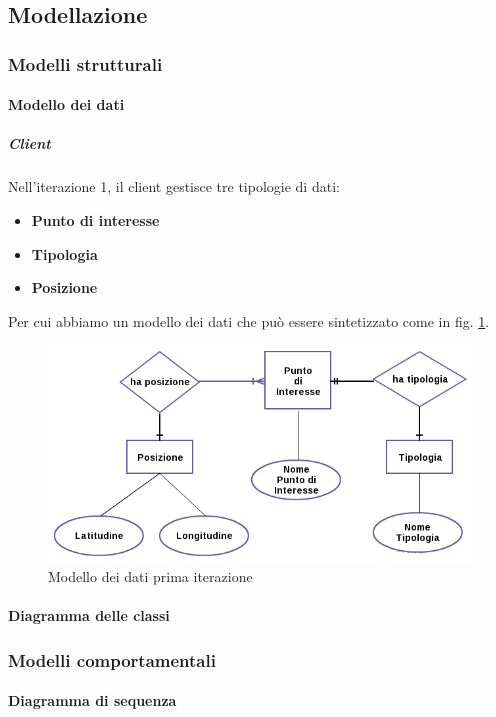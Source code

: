 \subsection{Modellazione}
\subsubsection{Modelli strutturali}
\paragraph{Modello dei dati}
\subparagraph{Client}
Nell'iterazione 1, il client gestisce tre tipologie di dati:
\begin{itemize}
\item \textbf{Punto di interesse}
\item \textbf{Tipologia}
\item \textbf{Posizione}
\end{itemize}
Per cui abbiamo un modello dei dati che può essere sintetizzato come in fig. \ref{datamodel1iterazione}.
\begin{figure}
\includegraphics[scale=0.55]{imgs/model/DataModel1.png} 
\caption{Modello dei dati prima iterazione\label{datamodel1iterazione}}
\end{figure}

\paragraph{Diagramma delle classi}

\subsubsection{Modelli comportamentali}
\paragraph{Diagramma di sequenza}
